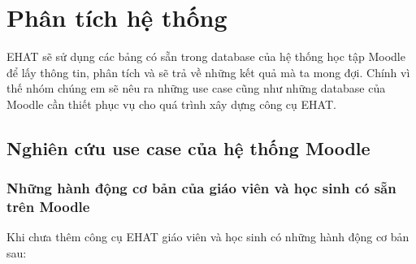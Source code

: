 \setcounter{chapter}{2}
\fontsize{13}{5}\selectfont
\chapter{Phân tích hệ thống}
EHAT sẽ sử dụng các bảng có sẵn trong database của hệ thống học tập Moodle để lấy thông tin, phân tích và sẽ trả về những kết quả mà ta mong đợi. Chính vì thế nhóm chúng em sẽ nêu ra những use case cũng như những database của Moodle cần thiết phục vụ cho quá trình xây dựng công cụ EHAT.
\section{Nghiên cứu use case của hệ thống Moodle}
\subsection{Những hành động cơ bản của giáo viên và học sinh có sẵn trên Moodle}
Khi chưa thêm công cụ EHAT giáo viên và học sinh có những hành động cơ bản sau: \cite{usecase:1}

